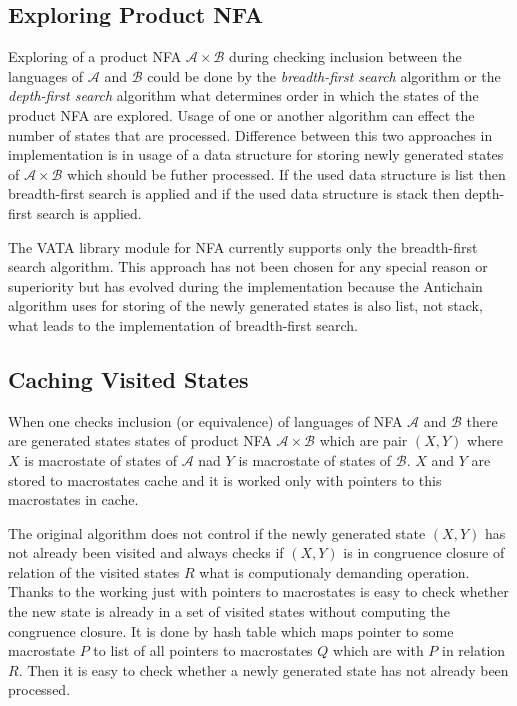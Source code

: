 \subsection{Exploring Product NFA}
Exploring of a product NFA $\mathcal{A}\times\mathcal{B}$ during checking inclusion between the languages of $\mathcal{A}$ and $\mathcal{B}$ could be done by 
the \emph{breadth-first search} algorithm or the \emph{depth-first search} algorithm what
determines order in which the states of the product NFA are explored. Usage of one or another algorithm can effect the number of states that are processed. 
Difference between this two approaches in implementation is in usage of a data structure for storing newly generated states of $\mathcal{A}\times\mathcal{B}$
which should be futher processed. If the used data structure is list then breadth-first search is applied and if the used data structure is stack then 
depth-first search is applied.

The VATA library module for NFA currently supports only the breadth-first search algorithm. This approach has not been chosen for any special reason or superiority
but has evolved during the implementation because the Antichain algorithm uses for storing of 
the newly generated states is also list, not stack, what leads to the implementation of breadth-first search.


\subsection{Caching Visited States}
When one checks inclusion (or equivalence) of languages of NFA $\mathcal{A}$ and $\mathcal{B}$ there are generated states states of product NFA $\mathcal{A}
\times \mathcal{B}$ which are pair $(X,Y)$ where $X$ is macrostate of states of $\mathcal{A}$ nad $Y$ is macrostate of states of $\mathcal{B}$. $X$ and $Y$
are stored to macrostates cache and it is worked only with pointers to this macrostates in cache.

The original algorithm does not control if the newly generated state $(X,Y)$ has not already been visited and always checks if $(X,Y)$ is in
congruence closure of relation of the visited states $R$  what is
computionaly demanding operation. Thanks to the working just with pointers to macrostates is easy to check whether the new state is already in a set of 
visited states without computing the congruence closure. It is done by hash table which maps pointer to some macrostate $P$ to list of all
pointers to macrostates $Q$ which are with $P$ in relation $R$. Then it is easy to check whether a newly generated state has not already been
processed. 

